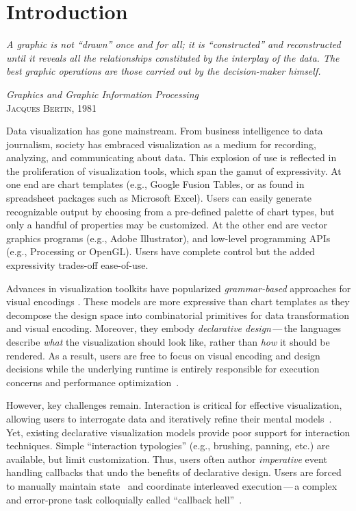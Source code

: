 \chapter{Introduction}

\vspace{-35pt}

\setlength{}
\epigraph{\textit{A graphic is not ``drawn'' once and for all; it is
``constructed'' and reconstructed until it reveals all the relationships
 constituted by the interplay of the data. The best graphic operations are those
 carried out by the decision-maker himself.}} {\textit{Graphics and Graphic
 Information Processing}\\\textsc{Jacques Bertin, 1981}}

Data visualization has gone mainstream. From business intelligence to data
journalism, society has embraced visualization as a medium for recording,
analyzing, and communicating about data. This explosion of use is reflected in
the proliferation of visualization tools, which span the gamut of expressivity.
At one end are chart templates (e.g., Google Fusion Tables, or as found in
spreadsheet packages such as Microsoft Excel). Users can easily generate
recognizable output by choosing from a pre-defined palette of chart types, but
only a handful of properties may be customized. At the other end are vector
graphics programs (e.g., Adobe Illustrator), and low-level programming APIs
(e.g., Processing or OpenGL). Users have complete control but the added
expressivity trades-off ease-of-use.

Advances in visualization toolkits have popularized \emph{grammar-based}
approaches for visual encodings
\cite{wilkinson:grammar,stolte:polaris,wickham:layered,bostock:protovis,bostock:d3}.
These models are more expressive than chart templates as they decompose the
design space into combinatorial primitives for data transformation and visual
encoding. Moreover, they embody \emph{declarative design}\,---\,the languages
describe \emph{what} the visualization should look like, rather than \emph{how}
it should be rendered. As a result, users are free to focus on visual encoding
and design decisions while the underlying runtime is entirely responsible for
execution concerns and performance optimization~\cite{heer:protovisjava}.

However, key challenges remain. Interaction is critical for effective
visualization, allowing users to interrogate data and iteratively refine their
mental models~\cite{pike:interactionscience,yi:understanding}. Yet, existing
declarative visualization models provide poor support for interaction
techniques. Simple ``interaction typologies'' (e.g., brushing, panning, etc.)
are available, but limit customization. Thus, users often author
\emph{imperative} event handling callbacks that undo the benefits of declarative
design. Users are forced to manually maintain state~\cite{cooper:embedding} and
coordinate interleaved execution\,---\,a complex and error-prone task
colloquially called ``callback hell''~\cite{edwards:coherent}.

